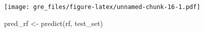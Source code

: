 \documentclass[
]{article}
\newenvironment{Shaded}{\begin{snugshade}}{\end{snugshade}}
\newcommand{\FunctionTok}[1]{\textcolor[rgb]{0.00,0.00,0.00}{#1}}
\newcommand{\NormalTok}[1]{#1}
\newcommand{\OtherTok}[1]{\textcolor[rgb]{0.56,0.35,0.01}{#1}}
\newcommand{\SpecialCharTok}[1]{\textcolor[rgb]{0.00,0.00,0.00}{#1}}
\newcommand{\StringTok}[1]{\textcolor[rgb]{0.31,0.60,0.02}{#1}}
\begin{document}
\texttt{[image: gre\_files/figure-latex/unnamed-chunk-16-1.pdf]}

\begin{Shaded}
\begin{Highlighting}[]
\NormalTok{pred\_rf }\OtherTok{\textless{}{-}} \FunctionTok{predict}\NormalTok{(rf, test\_set)}
\end{Highlighting}
\end{Shaded}

\begin{Shaded}
\end{Shaded}
\end{document}
